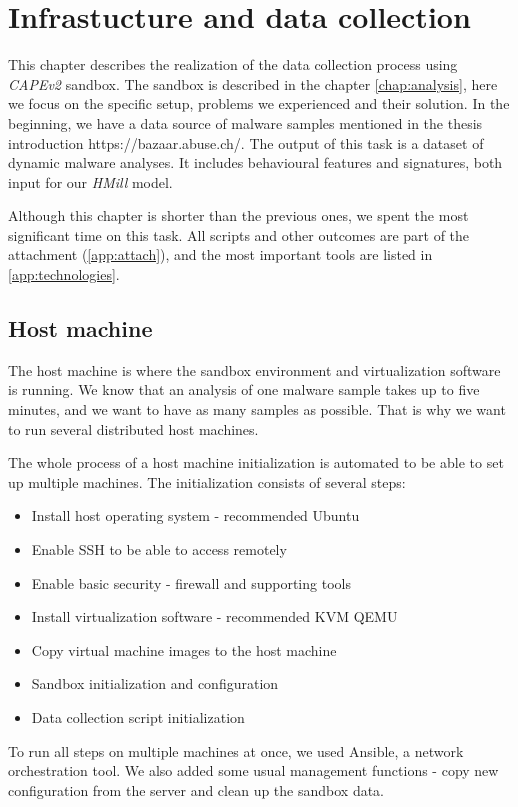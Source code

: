 \chapter{Infrastucture and data collection} \label{chap:infrastructure}
This chapter describes the realization of the data collection process using \emph{CAPEv2} sandbox. The sandbox is described in the chapter \ref{chap:analysis}, here we focus on the specific setup, problems we experienced and their solution. In the beginning, we have a data source of malware samples mentioned in the thesis introduction https://bazaar.abuse.ch/. The output of this task is a dataset of dynamic malware analyses. It includes behavioural features and signatures, both input for our \emph{HMill} model.

Although this chapter is shorter than the previous ones, we spent the most significant time on this task. All scripts and other outcomes are part of the attachment (\ref{app:attach}), and the most important tools are listed in \ref{app:technologies}.

\section{Host machine}
The host machine is where the sandbox environment and virtualization software is running. We know that an analysis of one malware sample takes up to five minutes, and we want to have as many samples as possible. That is why we want to run several distributed host machines. 

The whole process of a host machine initialization is automated to be able to set up multiple machines. The initialization consists of several steps:
\begin{itemize}
    \itemsep0em 
    \item Install host operating system - recommended Ubuntu
    \item Enable SSH to be able to access remotely
    \item Enable basic security - firewall and supporting tools
    \item Install virtualization software - recommended KVM QEMU
    \item Copy virtual machine images to the host machine
    \item Sandbox initialization and configuration
    \item Data collection script initialization
\end{itemize}

To run all steps on multiple machines at once, we used Ansible, a network orchestration tool. We also added some usual management functions - copy new configuration from the server and clean up the sandbox data.

